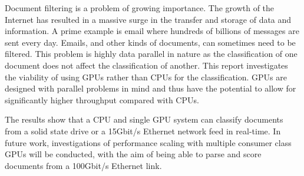 Document filtering is a problem of growing importance. The growth of the
Internet has resulted in a massive surge in the transfer and storage of data and
information. A prime example is email where hundreds of billions of messages
are sent every day. Emails, and other kinds of documents, can sometimes need to
be filtered. This problem is highly data parallel in nature as the
classification of one document does not affect the classification of another.
This report investigates the viability of using GPUs rather than CPUs for the
classification. GPUs are designed with parallel problems in mind and thus have
the potential to allow for significantly higher throughput compared with CPUs.

The results show that a CPU and single GPU system can classify documents from a
solid state drive or a 15Gbit/s Ethernet network feed in real-time. In future
work, investigations of performance scaling with multiple consumer class GPUs
will be conducted, with the aim of being able to parse and score documents from
a 100Gbit/s Ethernet link.
